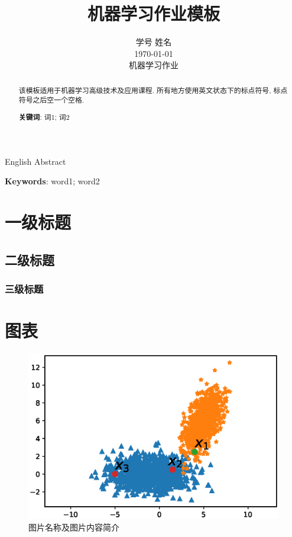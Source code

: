 \documentclass[letterpaper, 10pt, conference, twoside]{ieeeconf}
\title{\LARGE \bf
机器学习作业模板
}
\author{学号 \quad 姓名\\ \today\\ 机器学习作业}
\begin{document}
\maketitle



\begin{abstract}
该模板适用于机器学习高级技术及应用课程. 所有地方使用英文状态下的标点符号, 标点符号之后空一个空格.

\vspace{1ex}\noindent\textbf{关键词}: 词1; 词2

\end{abstract}

\begin{eabstract}
	English Abstract
	
\vspace{1ex}\noindent\textbf{Keywords}: word1; word2
\end{eabstract}


\section{一级标题}
\subsection{二级标题}
\subsubsection{三级标题}




\section{图表}

\begin{figure}[htbp]
  \centering
  \includegraphics[width = 1\linewidth]{smooth}
  \caption{图片名称及图片内容简介}
  \label{fig:fig1}
\end{figure}
\end{document}
